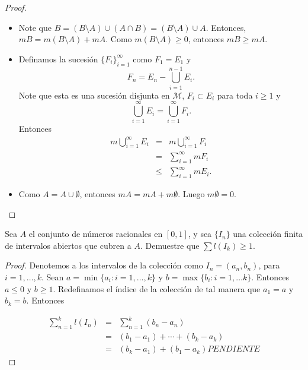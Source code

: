 \documentclass[12pt]{article}
\newenvironment{problem}[2][Problema]{\begin{trivlist}
\item[\hskip \labelsep {\bfseries #1}\hskip \labelsep {\bfseries #2.}]}{\end{trivlist}}
\begin{document}
\begin{proof}
\begin{itemize}
    \item[a)] Note que $B = (B \setminus A) \cup (A \cap B) = (B \setminus A) \cup A$. Entonces, $m B = m  (B \setminus A) + m A$. Como $m  (B \setminus A) \geq 0$, entonces $m B \geq m A.$
    \item[b)] Definamos la sucesión $\{ F_i \}_{i=1}^\infty$ como $F_1 = E_1$ y 
    $$F_n = E_n - \bigcup_{i=1}^{n-1} E_i.$$
Note que esta es una sucesión disjunta en $\mathcal M$, $F_i \subset E_i$ para toda $i \geq 1$ y 
$$\bigcup_{i=1}^{\infty} E_i  = \bigcup_{i=1}^{\infty} F_i.$$
Entonces 
\begin{eqnarray*}
    m \bigcup_{i=1}^{\infty} E_i  &=& m \bigcup_{i=1}^{\infty} F_i \\
    &=& \sum_{i=1}^{\infty} m F_i \\
    &\leq& \sum_{i=1}^{\infty} m E_i.
\end{eqnarray*}

\item[c)] Como $A = A \cup \emptyset$, entonces 
$m A = m A + m \emptyset$. Luego $m \emptyset = 0.$
\end{itemize}
\end{proof}

\begin{problem}{4} Sea $A$ el conjunto de números racionales en $[0, 1]$, y sea $\{I_n\}$ una colección finita de intervalos abiertos que cubren a $A$. Demuestre que $\sum l(I_k) \geq 1. $  
\end{problem}
\begin{proof}
Denotemos a los intervalos de la colección como $I_n = (a_n, b_n)$, para $i=1, \ldots, k$. Sean $a = \min \{ a_i: i=1, \ldots, k \}$ y $b = \max \{b_i: i=1, \ldots k \}$. Entonces $a \leq 0$ y $b \geq 1.$ Redefinamos el  índice de la colección de tal manera que $a_1 = a$ y $b_k = b$. Entonces 

\begin{eqnarray*}
     \sum_{n=1}^k l(I_n) &=&  \sum_{n=1}^k (b_n - a_n)\\
     &=& (b_1 - a_1) + \cdots + (b_k - a_k) \\
     &=& (b_k - a_1) + (b_1 - a_k) PENDIENTE
\end{eqnarray*}



\end{proof}
\end{document}
